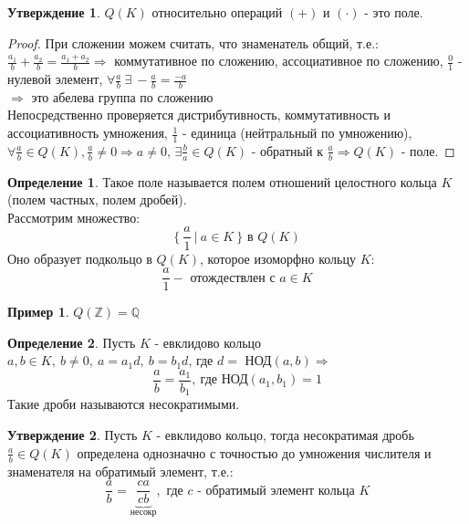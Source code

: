 \documentclass[a4paper, 12pt]{article}
\newcommand{\Q}{\mathbb Q}
\newcommand{\Z}{\mathbb Z}
\theoremstyle{definition}
\newtheorem*{definition}{Определение}
\newtheorem*{subtheorem}{Утверждение}
\newtheorem*{example1}{Пример}
\begin{document}
  \begin{subtheorem}
    $Q(K)$ относительно операций $(+)$ и $(\cdot)$ - это поле. 
  \end{subtheorem}
  \begin{proof}
    При сложении можем считать, что знаменатель общий, т.е.:\\ 
    $\frac{a_1}{b} + \frac{a_2}{b} = \frac{a_1+a_2}{b} \Longrightarrow $ коммутативное по сложению, ассоциативное по сложению, $\frac{0}{1}$ - нулевой элемент, $\forall \frac{a}{b} \  \exists \ -\frac{a}{b} = \frac{-a}{b}$\\
    $\Longrightarrow $ это абелева группа по сложению\\
    Непосредственно проверяется дистрибутивность, коммутативность и ассоциативность умножения, $\frac{1}{1}$ - единица (нейтральный по умножению),\\ $\forall \frac{a}{b} \in Q(K), \frac{a}{b} \neq 0 \Longrightarrow a \neq 0$, $\exists \frac{b}{a} \in Q(K)$ - обратный к $\frac{a}{b} \Longrightarrow Q(K)$ - поле.        
  \end{proof} 
  \begin{definition}
    Такое поле называется полем отношений целостного кольца $K$ (полем частных, полем дробей).\\ 
    Рассмотрим множество: 
    $$\{ \ \frac{a}{1} \ | \ a \in K\ \} \text{ в } Q(K)$$
    Оно образует подкольцо в $Q(K)$, которое изоморфно кольцу $K$:
    $$\frac{a}{1} - \text{ отождествлен с } a \in K$$
  \end{definition}
  \begin{example1}
    $Q(\Z) = \Q$
  \end{example1} 
  \begin{definition}
    Пусть $K$ - евклидово кольцо\\
    $a, b \in K, \ b\neq 0, \ a = a_1d, \ b = b_1d$, где $d = $ НОД$(a, b)\Longrightarrow $
    $$\frac{a}{b} = \frac{a_1}{b_1}, \  \text{где НОД}(a_1, b_1) = 1$$  
    Такие дроби называются несократимыми.
  \end{definition} 
  \begin{subtheorem}
    Пусть $K$ - евклидово кольцо, тогда несократимая дробь $\frac{a}{b} \in Q(K)$ определена однозначно с точностью до умножения числителя и знаменателя на обратимый элемент, т.е.:
    $$\frac{a}{b} = \underbrace{\frac{ca}{cb}}_{\text{несокр}} , \text{ где } c \text{ - обратимый элемент кольца } K$$ 
  \end{subtheorem}
\end{document}
